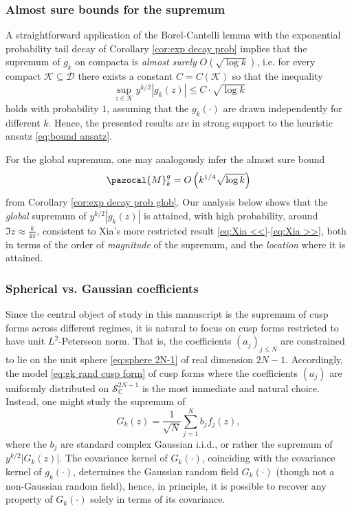\documentclass[12pt, a4paper]{amsart}
\theoremstyle{definition}
\newcommand {\1} {\mathbf{1}}
\newcommand {\C} {\mathbb {C}}
\newcommand {\M} {\pazocal {M}}
\newcommand {\Dc} {\mathcal{D}}
\newcommand {\Kc} {\mathcal{K}}
\newcommand{\Scc}{{\mathcal{S}}}
\numberwithin{equation}{section}
\begin{document}
\subsubsection{{\bf Almost sure bounds for the supremum}}

A straightforward application of the Borel-Cantelli lemma with the exponential probability tail decay of Corollary \ref{cor:exp decay prob} implies that the supremum of $g_{k}$ on compacta is {\em almost surely}
$O\left(\sqrt{\log{k}} \right)$, i.e. for every compact $\Kc\subseteq\Dc$ there exists a constant $C=C(\Kc)$ so that the inequality $$\sup_{z \in \Kc} y^{k/2} |g_{k}(z)|\le C\cdot \sqrt{\log{k}}$$ holds with probability $1$,
assuming that the $g_{k}(\cdot)$ are drawn independently
for different $k$. Hence, the presented results are in strong support to the heuristic ansatz \eqref{eq:bound ansatz}.

For the global supremum, one may analogously infer the almost sure bound $$\M^{g}_{k} = O\left(k^{1/4}\sqrt{\log{k}} \right)$$ from Corollary \ref{cor:exp decay prob glob}.
Our analysis below shows that the {\em global} supremum of $y^{k/2} |g_{k}(z)|$ is attained, with high probability,
around $\Im{z}\approx \frac{k}{4\pi}$,
consistent to Xia's more restricted result \eqref{eq:Xia <<}-\eqref{eq:Xia >>}, both in terms of the order of {\em magnitude} of the supremum,
and the {\em location} where it is attained.



\subsubsection{{\bf Spherical vs. Gaussian coefficients}}
\label{sec:spher vs Gauss}



Since the central object of study in this manuscript is the supremum of cusp forms across different regimes, it is natural to focus on cusp forms restricted to have unit $L^2$-Petersson norm. That is,
the coefficients $(a_{j})_{j\le N}$ are constrained to lie on the unit sphere \eqref{eq:sphere 2N-1} of real dimension $2N-1$. Accordingly, the model \eqref{eq:gk rand cusp form} of cusp forms where 
the coefficients $(a_{j})$ are uniformly distributed
on $\Scc^{2N-1}_{\C}$ is the most immediate and natural choice.
Instead, one might study the supremum of  
\begin{equation}
\label{eq:Gk Gauss def}
G_{k}(z) = \frac{1}{\sqrt{N}}\sum\limits_{j=1}^{N}b_{j}f_{j}(z),
\end{equation}
where the $b_{j}$ are standard complex Gaussian i.i.d., or rather the supremum of $y^{k/2}|G_{k}(z)|$. The covariance kernel of $G_{k}(\cdot)$, coinciding with the covariance kernel of $g_{k}(\cdot)$, determines the Gaussian random field $G_{k}(\cdot)$
(though not a non-Gaussian random field), hence, in principle, it is possible to recover any property of $G_{k}(\cdot)$ solely in terms of its covariance.
\end{document}
